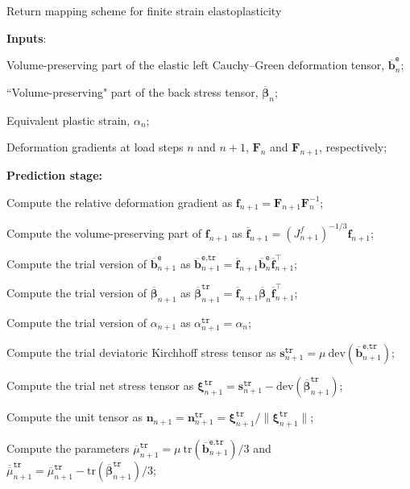\documentclass[preprint,11pt]{elsarticle}
\theoremstyle{definition}
\begin{document}
\begin{algorithm}[!htbp]
\caption{Return mapping scheme for finite strain elastoplasticity}
\label{Algorithm of Return Mapping Scheme}

\textbf{Inputs}:

Volume-preserving part of the elastic left Cauchy--Green deformation tensor, $\overline{\mathbf{b}}_n^\texttt{e}$;

``Volume-preserving" part of the back stress tensor, $\overline{\boldsymbol{\beta}}_n$;

Equivalent plastic strain, $\alpha_n$;

Deformation gradients at load steps $n$ and $n+1$, $\mathbf{F}_n$ and $\mathbf{F}_{n+1}$, respectively;

\textbf{Prediction stage:}

Compute the relative deformation gradient as $\mathbf{f}_{n+1} = \mathbf{F}_{n+1} \mathbf{F}_n^{-1}$;

Compute the volume-preserving part of $\mathbf{f}_{n+1}$ as $\overline{\mathbf{f}}_{n+1} = {\left( J_{n+1}^f \right)}^{-1/3} \mathbf{f}_{n+1}$;

Compute the trial version of $\overline{\mathbf{b}}_{n+1}^\texttt{e}$ as 
$\overline{\mathbf{b}}_{n+1}^\texttt{e,tr} = \overline{\mathbf{f}}_{n+1} \overline{\mathbf{b}}_n^\texttt{e} \overline{\mathbf{f}}_{n+1}^\top$;

Compute the trial version of $\overline{\boldsymbol{\beta}}_{n+1}$ as $\overline{\boldsymbol{\beta}}_{n+1}^\texttt{tr} = \overline{\mathbf{f}}_{n+1} \overline{\boldsymbol{\beta}}_n \overline{\mathbf{f}}_{n+1}^\top$;

Compute the trial version of $\alpha_{n+1}$ as $\alpha_{n+1}^\texttt{tr} = \alpha_n$;

Compute the trial deviatoric Kirchhoff stress tensor as $\mathbf{s}_{n+1}^\texttt{tr} = \mu\ \text{dev} \left( \overline{\mathbf{b}}_{n+1}^\texttt{e,tr} \right)$;

Compute the trial net stress tensor as $\boldsymbol{\xi}_{n+1}^\texttt{tr} = \mathbf{s}_{n+1}^\texttt{tr} - \text{dev} \left( \overline{\boldsymbol{\beta}}_{n+1}^\texttt{tr} \right)$;

Compute the unit tensor as $\mathbf{n}_{n+1} = \mathbf{n}_{n+1}^\texttt{tr} = \boldsymbol{\xi}_{n+1}^\texttt{tr} / \lVert \boldsymbol{\xi}_{n+1}^\texttt{tr} \rVert$;

Compute the parameters $\overline{\mu}_{n+1}^\texttt{tr} = \mu\ \text{tr}\left( \overline{\mathbf{b}}_{n+1}^\texttt{e,tr} \right) / 3$ and $\overline{\overline{\mu}}_{n+1}^\texttt{tr} = \overline{\mu}_{n+1}^\texttt{tr} - \text{tr} \left( \overline{\boldsymbol{\beta}}_{n+1}^\texttt{tr} \right) / 3$;


\end{algorithm}
\end{document}
